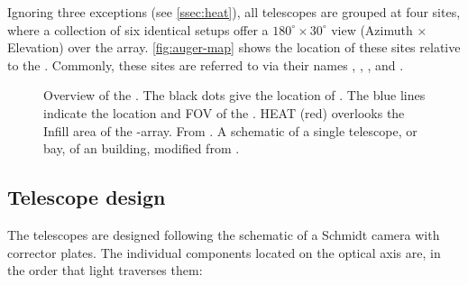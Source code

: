 Ignoring three exceptions (see \autoref{ssec:heat}), all telescopes are grouped
at four \FD sites, where a collection of six identical setups offer a $180^\circ
\times30^\circ$ view (Azimuth $\times$ Elevation) over the \SD array. 
\autoref{fig:auger-map} shows the location of these sites relative to the \SD.
Commonly, these sites are referred to via their names \CO, \LA, \LM, and \LL.

\begin{figure}[t]
  \centering
  \hspace{0.2cm}
  \caption[]{ Overview of the \PAO. The black dots give the 
  location of \WCDs. The blue lines indicate the location and FOV of the \FD. 
  HEAT (red) overlooks the Infill area of the \SD-array. From 
  \cite{veberic_index_nodate}.  A schematic of a single
  telescope, or bay, of an \FD building, modified from 
\cite{abraham_fluorescence_2010}.}
  \label{fig:pao-images}
\end{figure}


\subsection{Telescope design}
\label{ssec:fd-design}

The \FD telescopes are designed following the schematic of a Schmidt camera with 
corrector plates. The individual components located on the optical axis are, in 
the order that light traverses them:

